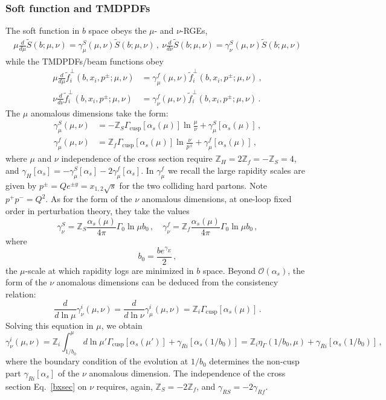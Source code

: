 \documentclass[a4,letterpaper,11pt]{article}
\newcommand{\nn}{\nonumber}
\newcommand{\be}{\begin{equation}}
\newcommand{\ee}{\end{equation}}
\newcommand{\as}{\alpha_s}
\newcommand{\cO}{\mathcal{O}}
\newcommand{\zed}{\mathbb{Z}}
\newcommand{\wt}{\widetilde}
\newcommand{\eq}[1]{Eq.~\eqref{#1}}
\begin{document}
\subsubsection{Soft function and TMDPDFs}
The soft function in $b$ space obeys the $\mu$- and $\nu$-RGEs,
\begin{align}
\mu\frac{d}{d\mu}\wt S(b;\mu,\nu) = \gamma_\mu^S(\mu,\nu) \wt S(b;\mu,\nu)\,, \  \nu\frac{d}{d\nu}\wt S(b;\mu,\nu) = \gamma_\nu^S (\mu,\nu) \wt S(b;\mu,\nu) 
\end{align}
while the TMDPDFs/beam functions obey
\begin{align}
\mu\frac{d}{d\mu}\wt f_i^\perp(b,x_i,p^\pm;\mu,\nu) &= \gamma_\mu^f(\mu,\nu) \wt f_i^\perp(b,x_i,p^\pm;\mu,\nu)\,, \\
 \nu\frac{d}{d\nu}\wt f_i^\perp(b,x_i,p^\pm;\mu,\nu) &= \gamma_\nu^f (\mu,\nu) \wt f_i^\perp(b,x_i,p^\pm;\mu,\nu)\,.\nn
\end{align}
The $\mu$ anomalous dimensions take the form:
\begin{subequations}
\label{gammamu}
\begin{align}
\label{gammamuS}
\gamma_\mu^S(\mu,\nu) &= -\zed_S \Gamma_{\text{cusp}}[\as(\mu)] \ln\frac{\mu}{\nu} + \gamma_\mu^S[\as(\mu)]\,, \\
\label{gammamuf}
\gamma_\mu^f(\mu,\nu) &= \zed_f \Gamma_{\text{cusp}}[\as(\mu)] \ln\frac{\nu}{p^\pm} + \gamma_\mu^f[\as(\mu)]\,,
\end{align}
\end{subequations}
where $\mu$ and $\nu$ independence of the cross section require $\zed_H = 2\zed_f = -\zed_S = 4$, and $\gamma_H[\as] = -\gamma_\mu^S[\as] - 2\gamma_\mu^f[\as]$. In $\gamma_\mu^f$ we recall the large rapidity scales are given by $p^\pm = Qe^{\pm y} = x_{1,2}\sqrt{s}$  for the two colliding hard partons.
Note $p^+ p^- = Q^2$. As for the form of the $\nu$ anomalous dimensions, at one-loop fixed order in perturbation theory, they take the values
\be
\label{gammanu}
\gamma_\nu^S = \zed_S \frac{\alpha_s(\mu)}{4 \pi}\Gamma_0 \ln \mu b_0\,,\quad \gamma_\nu^f = \zed_f \frac{\alpha_s(\mu)}{4 \pi}\Gamma_0 \ln\mu b_0\,,
\ee
where 
\be
\label{mub}
b_0 = \frac{be^{\gamma_E}}{2}\,,
\ee
the $\mu$-scale at which rapidity logs are minimized in $b$ space. Beyond $\cO(\as)$, the form of the $\nu$ anomalous dimensions can be deduced from the consistency relation:
\be
\frac{d}{d\ln\mu}\gamma_\nu^i(\mu,\nu) = \frac{d}{d\ln\nu} \gamma_\mu^i(\mu,\nu) = \zed_i \Gamma_{\text{cusp}}[\as(\mu)]\,.
\ee
Solving this equation in $\mu$, we obtain
\be
\label{gammanurun}
\gamma_\nu^i (\mu,\nu) = \zed_i\int_{1/b_0}^\mu d\ln\mu' \Gamma_{\text{cusp}}[\as(\mu')] + \gamma_{Ri}[\as(1/b_0)]= \zed_i\eta_\Gamma(1/b_0,\mu) + \gamma_{Ri}[\as(1/b_0)]\,,
\ee
where the boundary condition of the evolution at $1/b_0$ determines the non-cusp part $\gamma_{Ri}[\as]$ of the $\nu$ anomalous dimension. The independence of the cross section \eq{bxsec} on $\nu$ requires, again, $\zed_S = -2\zed_f$, and $\gamma_{RS} = -2\gamma_{Rf}$.
\end{document}

